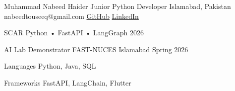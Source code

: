 \documentclass{../cls/resume}
\begin{document}
\ResumeHeader
    {Muhammad Nabeed Haider}
    {Junior Python Developer}
    {Islamabad, Pakistan}
    {nabeedtouseeq@gmail.com}
    {\href{https://github.com/m-nabeed-haider}{GitHub}}
    {\href{https://linkedin.com/in/muhammad-nabeed-haider-92a371240}{LinkedIn}}


\ResumeProject
    {SCAR}
    {Python • FastAPI • LangGraph}
    {2026}

\begin{ResumeList}
\end{ResumeList}


\ResumeExperience
    {AI Lab Demonstrator}
    {FAST-NUCES Islamabad}
    {Spring 2026}

\begin{ResumeList}
\end{ResumeList}


\ResumeSkillCategory
    {Languages}
    {Python, Java, SQL}

\ResumeSkillCategory
    {Frameworks}
    {FastAPI, LangChain, Flutter}
\end{document}
